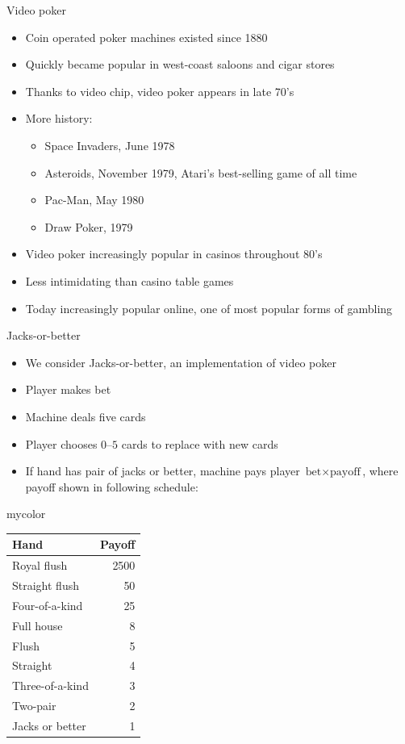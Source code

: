 \documentclass[handout,xcolor=dvipsnames]{beamer}
\theoremstyle{definition}
\begin{document}
\begin{frame}{Video poker}
\begin{itemize}
\item Coin operated poker machines existed since 1880
\item Quickly became popular in west-coast
saloons and cigar stores
\item Thanks to video chip, video poker appears in late 70's
\item More history:
\begin{itemize}
\item \alert{Space Invaders}, June 1978
\item \alert{Asteroids}, November 1979, Atari's best-selling game of all time
\item \alert{Pac-Man}, May 1980
\item \alert{Draw Poker}, 1979
\end{itemize}
\item Video poker increasingly popular in casinos throughout 80's
\item Less intimidating than casino table games
\item Today increasingly popular online, one of most popular
forms of gambling
\end{itemize}
\end{frame}

\begin{frame}{Jacks-or-better}
\begin{multicols}{2}
\begin{itemize}
\item We consider \alert{Jacks-or-better},
an implementation of video poker
\item Player makes bet
\item Machine deals five cards
\item Player chooses $0$--$5$ cards to replace with new cards
\item If hand has pair of jacks or better, machine pays
player $\text{bet}\times\text{payoff}$, where payoff shown in
following schedule:
\end{itemize}
\begin{beamercolorbox}{mycolor}
\begin{tabular}{lr}
Hand&Payoff\\\hline
Royal flush&2500\\
Straight flush&50\\
Four-of-a-kind&25\\
Full house&8\\
Flush&5\\
Straight&4\\
Three-of-a-kind&3\\
Two-pair&2\\
Jacks or better&1
\end{tabular}
\end{beamercolorbox}
\end{multicols}
\end{frame}
\end{document}
